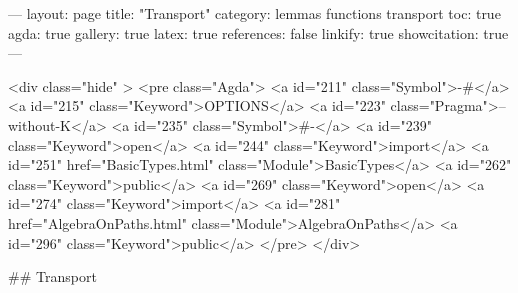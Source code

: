 
---
layout: page
title: "Transport"
category: lemmas functions transport
toc: true
agda: true
gallery: true
latex: true
references: false
linkify: true
showcitation: true
---

<div class="hide" >
<pre class="Agda">
<a id="211" class="Symbol">{-#</a> <a id="215" class="Keyword">OPTIONS</a> <a id="223" class="Pragma">--without-K</a> <a id="235" class="Symbol">#-}</a>
<a id="239" class="Keyword">open</a> <a id="244" class="Keyword">import</a> <a id="251" href="BasicTypes.html" class="Module">BasicTypes</a> <a id="262" class="Keyword">public</a>
<a id="269" class="Keyword">open</a> <a id="274" class="Keyword">import</a> <a id="281" href="AlgebraOnPaths.html" class="Module">AlgebraOnPaths</a> <a id="296" class="Keyword">public</a>
</pre>
</div>

## Transport

